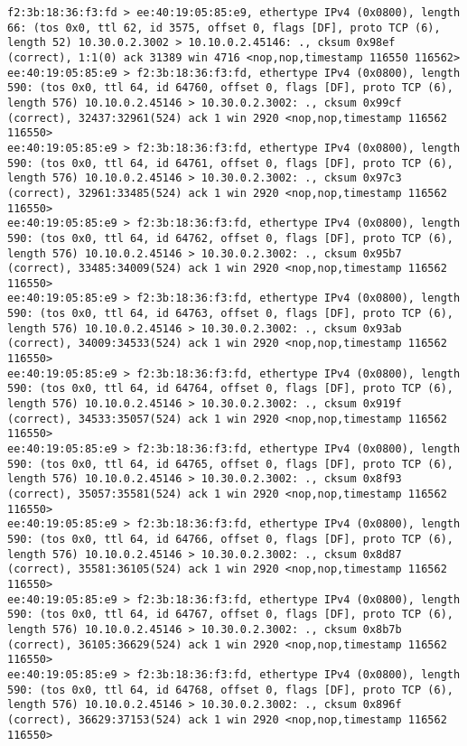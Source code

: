 \documentclass[a4paper,12pt]{article}
\begin{document}
\begin{Verbatim}
f2:3b:18:36:f3:fd > ee:40:19:05:85:e9, ethertype IPv4 (0x0800), length 66: (tos 0x0, ttl 62, id 3575, offset 0, flags [DF], proto TCP (6), length 52) 10.30.0.2.3002 > 10.10.0.2.45146: ., cksum 0x98ef (correct), 1:1(0) ack 31389 win 4716 <nop,nop,timestamp 116550 116562>
ee:40:19:05:85:e9 > f2:3b:18:36:f3:fd, ethertype IPv4 (0x0800), length 590: (tos 0x0, ttl 64, id 64760, offset 0, flags [DF], proto TCP (6), length 576) 10.10.0.2.45146 > 10.30.0.2.3002: ., cksum 0x99cf (correct), 32437:32961(524) ack 1 win 2920 <nop,nop,timestamp 116562 116550>
ee:40:19:05:85:e9 > f2:3b:18:36:f3:fd, ethertype IPv4 (0x0800), length 590: (tos 0x0, ttl 64, id 64761, offset 0, flags [DF], proto TCP (6), length 576) 10.10.0.2.45146 > 10.30.0.2.3002: ., cksum 0x97c3 (correct), 32961:33485(524) ack 1 win 2920 <nop,nop,timestamp 116562 116550>
ee:40:19:05:85:e9 > f2:3b:18:36:f3:fd, ethertype IPv4 (0x0800), length 590: (tos 0x0, ttl 64, id 64762, offset 0, flags [DF], proto TCP (6), length 576) 10.10.0.2.45146 > 10.30.0.2.3002: ., cksum 0x95b7 (correct), 33485:34009(524) ack 1 win 2920 <nop,nop,timestamp 116562 116550>
ee:40:19:05:85:e9 > f2:3b:18:36:f3:fd, ethertype IPv4 (0x0800), length 590: (tos 0x0, ttl 64, id 64763, offset 0, flags [DF], proto TCP (6), length 576) 10.10.0.2.45146 > 10.30.0.2.3002: ., cksum 0x93ab (correct), 34009:34533(524) ack 1 win 2920 <nop,nop,timestamp 116562 116550>
ee:40:19:05:85:e9 > f2:3b:18:36:f3:fd, ethertype IPv4 (0x0800), length 590: (tos 0x0, ttl 64, id 64764, offset 0, flags [DF], proto TCP (6), length 576) 10.10.0.2.45146 > 10.30.0.2.3002: ., cksum 0x919f (correct), 34533:35057(524) ack 1 win 2920 <nop,nop,timestamp 116562 116550>
ee:40:19:05:85:e9 > f2:3b:18:36:f3:fd, ethertype IPv4 (0x0800), length 590: (tos 0x0, ttl 64, id 64765, offset 0, flags [DF], proto TCP (6), length 576) 10.10.0.2.45146 > 10.30.0.2.3002: ., cksum 0x8f93 (correct), 35057:35581(524) ack 1 win 2920 <nop,nop,timestamp 116562 116550>
ee:40:19:05:85:e9 > f2:3b:18:36:f3:fd, ethertype IPv4 (0x0800), length 590: (tos 0x0, ttl 64, id 64766, offset 0, flags [DF], proto TCP (6), length 576) 10.10.0.2.45146 > 10.30.0.2.3002: ., cksum 0x8d87 (correct), 35581:36105(524) ack 1 win 2920 <nop,nop,timestamp 116562 116550>
ee:40:19:05:85:e9 > f2:3b:18:36:f3:fd, ethertype IPv4 (0x0800), length 590: (tos 0x0, ttl 64, id 64767, offset 0, flags [DF], proto TCP (6), length 576) 10.10.0.2.45146 > 10.30.0.2.3002: ., cksum 0x8b7b (correct), 36105:36629(524) ack 1 win 2920 <nop,nop,timestamp 116562 116550>
ee:40:19:05:85:e9 > f2:3b:18:36:f3:fd, ethertype IPv4 (0x0800), length 590: (tos 0x0, ttl 64, id 64768, offset 0, flags [DF], proto TCP (6), length 576) 10.10.0.2.45146 > 10.30.0.2.3002: ., cksum 0x896f (correct), 36629:37153(524) ack 1 win 2920 <nop,nop,timestamp 116562 116550>

\end{Verbatim}
\end{document}
